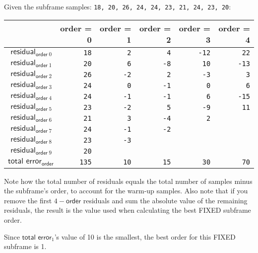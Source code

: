 Given the subframe samples: \texttt{18, 20, 26, 24, 24, 23, 21, 24, 23, 20}:
\begin{table}[h]
\begin{tabular}{r|r|r|r|r|r}
& \textsf{order} = 0 & \textsf{order} = 1 & \textsf{order} = 2 & \textsf{order} = 3 & \textsf{order} = 4 \\
\hline
$\textsf{residual}_{\textsf{order}~0}$ & \texttt{\color{gray}18} & \texttt{\color{gray}2} & \texttt{\color{gray}4} & \texttt{\color{gray}-12} & \texttt{22} \\
$\textsf{residual}_{\textsf{order}~1}$ & \texttt{\color{gray}20} & \texttt{\color{gray}6} & \texttt{\color{gray}-8} & \texttt{10} & \texttt{-13} \\
$\textsf{residual}_{\textsf{order}~2}$ & \texttt{\color{gray}26} & \texttt{\color{gray}-2} & \texttt{2} & \texttt{-3} & \texttt{3} \\
$\textsf{residual}_{\textsf{order}~3}$ & \texttt{\color{gray}24} & \texttt{0} & \texttt{-1} & \texttt{0} & \texttt{6} \\
$\textsf{residual}_{\textsf{order}~4}$ & \texttt{24} & \texttt{-1} & \texttt{-1} & \texttt{6} & \texttt{-15} \\
$\textsf{residual}_{\textsf{order}~5}$ & \texttt{23} & \texttt{-2} & \texttt{5} & \texttt{-9} & \texttt{11} \\
$\textsf{residual}_{\textsf{order}~6}$ & \texttt{21} & \texttt{3} & \texttt{-4} & \texttt{2} \\
$\textsf{residual}_{\textsf{order}~7}$ & \texttt{24} & \texttt{-1} & \texttt{-2} \\
$\textsf{residual}_{\textsf{order}~8}$ & \texttt{23} & \texttt{-3} \\
$\textsf{residual}_{\textsf{order}~9}$ & \texttt{20} \\
\hline
$\textsf{total error}_{\textsf{order}}$ & \texttt{135} & \texttt{10} & \texttt{15} & \texttt{30} & \texttt{70} \\
\end{tabular}
\end{table}
\par
\noindent
Note how the total number of residuals equals the
total number of samples minus the subframe's order,
to account for the warm-up samples.
Also note that if you remove the first $4 - \textsf{order}$ residuals
and sum the absolute value of the remaining residuals,
the result is the  value
used when calculating the best FIXED subframe order.
\par
Since $\textsf{total error}_1$'s value of 10 is the smallest,
the best order for this FIXED subframe is 1.

